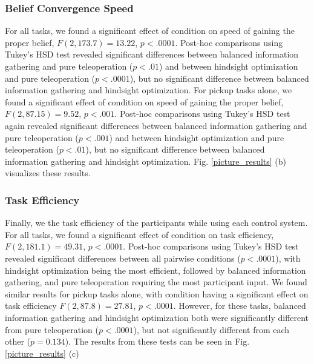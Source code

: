 \documentclass[conference]{IEEEtran}
\begin{document}
\subsubsection{Belief Convergence Speed}

For all tasks, we found a significant effect of condition on speed of gaining the proper belief, $F(2, 173.7) = 13.22$, $p < .0001$. Post-hoc comparisons using Tukey's HSD test revealed significant differences between balanced information gathering and pure teleoperation ($p < .01$) and between hindsight optimization and pure teleoperation ($p < .0001$), but no significant difference between balanced information gathering and hindsight optimization. For pickup tasks alone, we found a significant effect of condition on speed of gaining the proper belief, $F(2, 87.15) = 9.52$, $p < .001$. Post-hoc comparisons using Tukey's HSD test again revealed significant differences between balanced information gathering and pure teleoperation ($p < .001$) and between hindsight optimization and pure teleoperation ($p < .01$), but no significant difference between balanced information gathering and hindsight optimization. Fig. \ref{picture_results} (b) visualizes these results.

\subsubsection{Task Efficiency}

Finally, we the task efficiency of the participants while using each control system. For all tasks, we found a significant effect of condition on task efficiency, $F(2, 181.1) = 49.31$, $p < .0001$. Post-hoc comparisons using Tukey's HSD test revealed significant differences between all pairwise conditions ($p < .0001$), with hindsight optimization being the most efficient, followed by balanced information gathering, and pure teleoperation requiring the most participant input. We found similar results for pickup tasks alone, with condition having a significant effect on task efficiency $F(2, 87.8) = 27.81$, $p < .0001$. However, for these tasks, balanced information gathering and hindsight optimization both were significantly different from pure teleoperation ($p < .0001$), but not significantly different from each other ($p = 0.134$). The results from these tests can be seen in Fig. \ref{picture_results} (c)

\begin{figure*}
\caption{This figure shows the results of the ANOVA tests on our results. Part (a) contains the tests on efficiency of belief gain after shared autonomy control, Part (b) contains the tests on speed of gaining dominant proper belief, Part (c) contains the tests on task efficiency, and Part (d) contains results from our subjective measures}
\label{picture_results}
\end{figure*}
\end{document}
